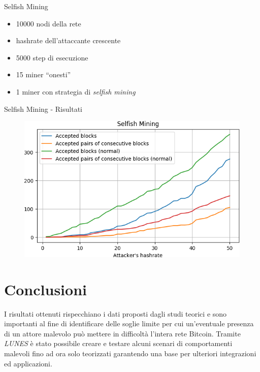\documentclass{beamer}
\begin{document}
\begin{frame}{Selfish Mining}
	\begin{itemize}
    	\item 10000 nodi della rete
        \item hashrate dell'attaccante crescente
        \item 5000 step di esecuzione
        \item 15 miner ``onesti''
        \item 1 miner con strategia di \textit{selfish mining}
    \end{itemize}
\end{frame}

\begin{frame}{Selfish Mining - Risultati}
	\begin{figure}
		\centering
        \includegraphics[width=0.9\linewidth]{./images/selfishtest.png}
	\end{figure}
\end{frame}


\section{Conclusioni}

\begin{frame}[plain]    
   	I risultati ottenuti rispecchiano i dati proposti dagli studi teorici e sono importanti al fine di identificare delle soglie limite per cui un'eventuale presenza di un attore malevolo può mettere in difficoltà l'intera rete Bitcoin.
    \vfill    
    Tramite \textit{LUNES} è stato possibile creare e testare alcuni scenari di comportamenti malevoli fino ad ora solo teorizzati garantendo una base per ulteriori integrazioni ed applicazioni.
\end{frame}
\end{document}
